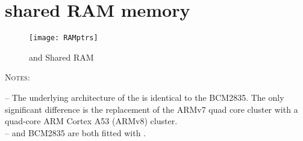 
\chapter{\bcm{} shared RAM memory} %

\label{AppendixB} %

\begin{figure}[!htbp]
\centering
\texttt{[image: RAMptrs]}
\caption{\vc{} and \cpu{} Shared RAM}
\end{figure}

\textsc{Notes}:

-- The underlying architecture of the \bcm{} is identical to the BCM2835. The only significant difference is the replacement of the ARMv7 quad core cluster with a quad-core ARM Cortex A53 (ARMv8) cluster.\\

-- \bcm{} and BCM2835 are both fitted with \vc.

